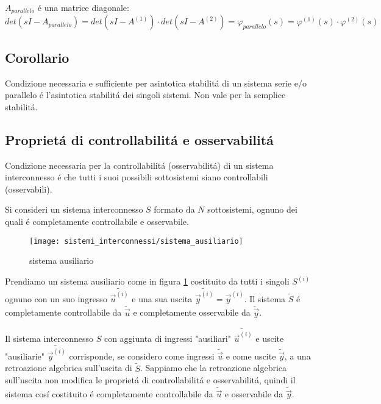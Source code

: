 \documentclass[../main.tex]{subfiles}
\begin{document}
			$ A_{parallelo} $ \'e una matrice diagonale:
			\[
				det(sI-A_{parallelo}) = det(sI-A^{(1)}) \cdot det(sI-A^{(2)}) = \varphi_{parallelo}(s) = \varphi^{(1)}(s) \cdot \varphi^{(2)}(s)
			\]
	\subsection{Corollario}
		Condizione necessaria e sufficiente per asintotica stabilit\'a di un sistema serie e/o parallelo \'e l'asintotica stabilit\'a dei singoli sistemi. Non vale per la semplice stabilit\'a.
		
	\subsection{Propriet\'a di controllabilit\'a e osservabilit\'a}
		Condizione necessaria per la controllabilit\'a (osservabilit\'a) di un sistema interconnesso \'e che tutti i suoi possibili sottosistemi siano controllabili (osservabili).
		
		Si consideri un sistema interconnesso $ S $ formato da $ N $ sottosistemi, ognuno dei quali \'e completamente controllabile e osservabile.
		
		\begin{figure}[H]
			\centering\texttt{[image: sistemi\_interconnessi/sistema\_ausiliario]}
			\caption{sistema ausiliario}
			\label{fig:sistema_ausiliario}
		\end{figure}
		Prendiamo un sistema ausiliario come in figura \ref{fig:sistema_ausiliario} costituito da tutti i singoli $ S^{(i)} $ ognuno con un suo ingresso $ \tilde{\vec u^{(i)}} $ e una sua uscita $ \tilde{\vec y^{(i)}} = \vec{y}^{(i)} $. Il sistema $ \tilde S $ \'e completamente controllabile da $ \tilde{\vec u} $ e completamente osservabile da $ \tilde{\vec y} $.
		
		Il sistema interconnesso $ S $ con aggiunta di ingressi "ausiliari" $ \tilde{\vec u^{(i)}} $ e uscite "ausiliarie" $ \tilde{\vec y^{(i)}} $ corrisponde, se considero come ingressi $ \tilde{\vec u} $ e come uscite $ \tilde{\vec y} $, a una retroazione algebrica sull'uscita di $ \tilde S $. Sappiamo che la retroazione algebrica sull'uscita non modifica le propriet\'a di controllabilit\'a e osservabilit\'a, quindi il sistema cos\'i costituito \'e completamente controllabile da $ \tilde{\vec u} $ e osservabile da $ \tilde{\vec y} $.
		
\end{document}
